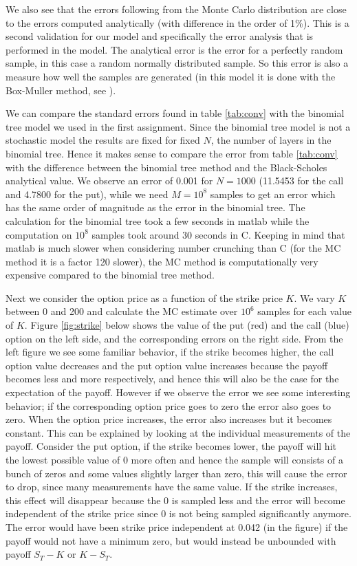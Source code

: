 \documentclass[11pt,a4paper]{article}
\begin{document}
We also see that the errors following from the Monte Carlo distribution are close to the errors computed analytically (with difference in the order of 1\%). This is a second validation for our model and specifically the error analysis that is performed in the model. The analytical error is the error for a perfectly random sample, in this case a random normally distributed sample. So this error is also a measure how well the samples are generated (in this model it is done with the Box-Muller method, see \cite{boxmuller}).

We can compare the standard errors found in table \ref{tab:conv} with the binomial tree model we used in the first assignment. Since the binomial tree model is not a stochastic model the results are fixed for fixed $N$, the number of layers in the binomial tree. Hence it makes sense to compare the error from table \ref{tab:conv} with the difference between the binomial tree method and the Black-Scholes analytical value. We observe an error of 0.001 for $N = 1000$ (11.5453 for the call and 4.7800 for the put), while we need $M = 10^8$ samples to get an error which has the same order of magnitude as the error in the binomial tree. The calculation for the binomial tree took a few seconds in matlab while the computation on $10^8$ samples took around 30 seconds in C. Keeping in mind that matlab is much slower when considering number crunching than C (for the MC method it is a factor 120 slower), the MC method is computationally very expensive compared to the binomial tree method.

Next we consider the option price as a function of the strike price $K$. We vary $K$ between 0 and 200 and calculate the MC estimate over $10^6$ samples for each value of $K$. Figure \ref{fig:strike} below shows the value of the put (red) and the call (blue) option on the left side, and the corresponding errors on the right side. From the left figure we see some familiar behavior, if the strike becomes higher, the call option value decreases and the put option value increases because the payoff becomes less and more respectively, and hence this will also be the case for the expectation of the payoff. However if we observe the error we see some interesting behavior; if the corresponding option price goes to zero the error also goes to zero. When the option price increases, the error also increases but it becomes constant. This can be explained by looking at the individual measurements of the payoff. Consider the put option, if the strike becomes lower, the payoff will hit the lowest possible value of 0 more often and hence the sample will consists of a bunch of zeros and some values slightly larger than zero, this will cause the error to drop, since many measurements have the same value. If the strike increases, this effect will disappear because the 0 is sampled less and the error will become independent of the strike price since 0 is not being sampled significantly anymore. The error would have been strike price independent at 0.042 (in the figure) if the payoff would not have a minimum zero, but would instead be unbounded with payoff $S_T - K$ or $K - S_T$.
\end{document}
